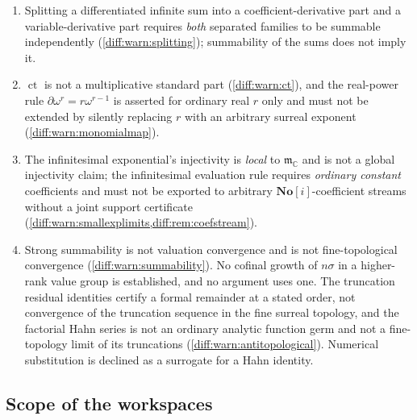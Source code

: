 \documentclass[11pt,letterpaper]{article}
\numberwithin{equation}{section}
\theoremstyle{definition}
\theoremstyle{remark}
\newcommand{\SC}{\mathbf{No}[i]}
\newcommand{\C}{\mathbb C}
\newcommand{\der}{\partial}
\newcommand{\mm}{\mathfrak m}
\newcommand{\ct}{\operatorname{ct}}
\begin{document}
\begin{enumerate}[label=\textup{N\arabic*.},leftmargin=3.0em,itemsep=0.35em,start=21]
substitution ``replace $\omega$ by $x$ in every surreal'' is never used
(\cref{diff:rem:nocomposition}).
\item Splitting a differentiated infinite sum into a coefficient-derivative
part and a variable-derivative part requires \emph{both} separated families to
be summable independently (\cref{diff:warn:splitting}); summability of the sums
does not imply it.
\item $\ct$ is not a multiplicative standard part
(\cref{diff:warn:ct}), and the real-power rule $\der\omega^{r}=r\omega^{r-1}$
is asserted for ordinary real $r$ only and must not be extended by silently
replacing $r$ with an arbitrary surreal exponent
(\cref{diff:warn:monomialmap}).
\item The infinitesimal exponential's injectivity is \emph{local} to
$\mm_{\C}$ and is not a global injectivity claim; the infinitesimal evaluation
rule requires \emph{ordinary constant} coefficients and must not be exported
to arbitrary $\SC$-coefficient streams without a joint support certificate
(\cref{diff:warn:smallexplimits,diff:rem:coefstream}).
\item Strong summability is not valuation convergence and is not
fine-topological convergence (\cref{diff:warn:summability}). No cofinal growth
of $n\sigma$ in a higher-rank value group is established, and no argument uses
one. The truncation residual identities certify a formal remainder at a stated
order, not convergence of the truncation sequence in the fine surreal topology, and
the factorial Hahn series is not an ordinary analytic function germ and not a
fine-topology limit of its truncations
(\cref{diff:warn:antitopological}). Numerical substitution is declined as a
surrogate for a Hahn identity.
\end{enumerate}

\subsection{Scope of the workspaces}
\label{diff:sub:nc:workspacescope}
\end{document}
